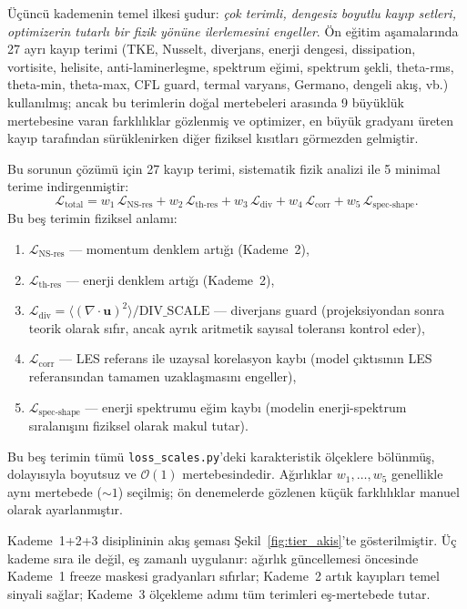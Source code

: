 Üçüncü kademenin temel ilkesi şudur: \emph{çok terimli, dengesiz boyutlu kayıp setleri, optimizerin tutarlı bir fizik yönüne ilerlemesini engeller}. Ön eğitim aşamalarında 27 ayrı kayıp terimi (TKE, Nusselt, diverjans, enerji dengesi, dissipation, vortisite, helisite, anti-laminerleşme, spektrum eğimi, spektrum şekli, theta-rms, theta-min, theta-max, CFL guard, termal varyans, Germano, dengeli akış, vb.) kullanılmış; ancak bu terimlerin doğal mertebeleri arasında 9 büyüklük mertebesine varan farklılıklar gözlenmiş ve optimizer, en büyük gradyanı üreten kayıp tarafından sürüklenirken diğer fiziksel kısıtları görmezden gelmiştir.

Bu sorunun çözümü için 27 kayıp terimi, sistematik fizik analizi ile 5 minimal terime indirgenmiştir:
\begin{equation}
\mathcal{L}_{\mathrm{total}} = w_{1}\,\mathcal{L}_{\mathrm{NS\text{-}res}} + w_{2}\,\mathcal{L}_{\mathrm{th\text{-}res}} + w_{3}\,\mathcal{L}_{\mathrm{div}} + w_{4}\,\mathcal{L}_{\mathrm{corr}} + w_{5}\,\mathcal{L}_{\mathrm{spec\text{-}shape}}.
\label{eq:total_loss}
\end{equation}
Bu beş terimin fiziksel anlamı:
\begin{enumerate}
  \item $\mathcal{L}_{\mathrm{NS\text{-}res}}$ --- momentum denklem artığı (Kademe~2),
  \item $\mathcal{L}_{\mathrm{th\text{-}res}}$ --- enerji denklem artığı (Kademe~2),
  \item $\mathcal{L}_{\mathrm{div}}=\langle(\nabla\cdot\mathbf{u})^{2}\rangle/\mathrm{DIV\_SCALE}$ --- diverjans guard (projeksiyondan sonra teorik olarak sıfır, ancak ayrık aritmetik sayısal toleransı kontrol eder),
  \item $\mathcal{L}_{\mathrm{corr}}$ --- LES referans ile uzaysal korelasyon kaybı (model çıktısının LES referansından tamamen uzaklaşmasını engeller),
  \item $\mathcal{L}_{\mathrm{spec\text{-}shape}}$ --- enerji spektrumu eğim kaybı (modelin enerji-spektrum sıralanışını fiziksel olarak makul tutar).
\end{enumerate}
Bu beş terimin tümü \texttt{loss\_scales.py}'deki karakteristik ölçeklere bölünmüş, dolayısıyla boyutsuz ve $\mathcal{O}(1)$ mertebesindedir. Ağırlıklar $w_{1},\dots,w_{5}$ genellikle aynı mertebede ($\sim 1$) seçilmiş; ön denemelerde gözlenen küçük farklılıklar manuel olarak ayarlanmıştır.

Kademe~1+2+3 disiplininin akış şeması Şekil~\ref{fig:tier_akis}'te gösterilmiştir. Üç kademe sıra ile değil, eş zamanlı uygulanır: ağırlık güncellemesi öncesinde Kademe~1 freeze maskesi gradyanları sıfırlar; Kademe~2 artık kayıpları temel sinyali sağlar; Kademe~3 ölçekleme adımı tüm terimleri eş-mertebede tutar.

